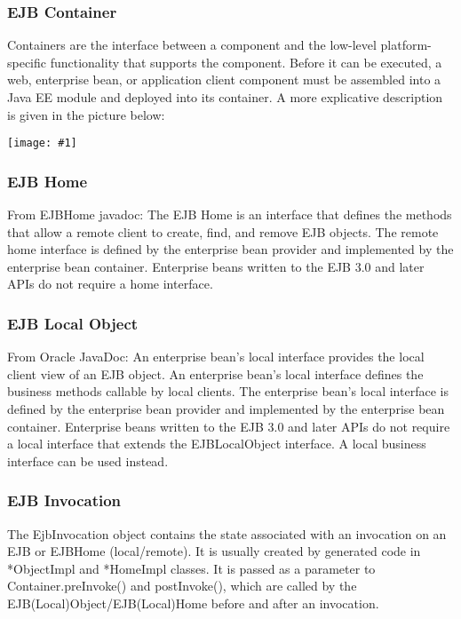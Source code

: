 \documentclass[11pt, a4paper,titlepage]{article}
\newcommand{\image}[1]{
	\begin{center}
		\noindent \texttt{[image: \#1]}
	\end{center}
	}
\begin{document}
	\subsubsection{EJB Container}
	Containers are the interface between a component and the low-level platform-specific functionality that supports the component. Before it can be executed, a web, enterprise bean, or application client component must be assembled into a Java EE module and deployed into its container. \newline
	A more explicative description is given in the picture below:
	\image{ejb_containers.png}
	\subsubsection{EJB Home}
	From EJBHome javadoc: \newline
	The EJB Home is an interface that defines the methods that allow a remote client to create, find, and remove EJB objects. \newline
	The remote home interface is defined by the enterprise bean provider and implemented by the enterprise bean container.\newline
	Enterprise beans written to the EJB 3.0 and later APIs do not require a home interface.
	\subsubsection{EJB Local Object}
	From Oracle JavaDoc: \newline
	An enterprise bean's local interface provides the local client view of an EJB object. An enterprise bean's local interface defines the business methods callable by local clients.
	The enterprise bean's local interface is defined by the enterprise bean provider and implemented by the enterprise bean container.
	Enterprise beans written to the EJB 3.0 and later APIs do not require a local interface that extends the EJBLocalObject interface. A local business interface can be used instead.

	\subsubsection{EJB Invocation}
	The EjbInvocation object contains the state associated with an invocation on an EJB or EJBHome (local/remote). It is usually created by generated code in *ObjectImpl and *HomeImpl classes. It is passed as a parameter to Container.preInvoke() and postInvoke(), which are called by the EJB(Local)Object/EJB(Local)Home before and after an invocation.
\end{document}
